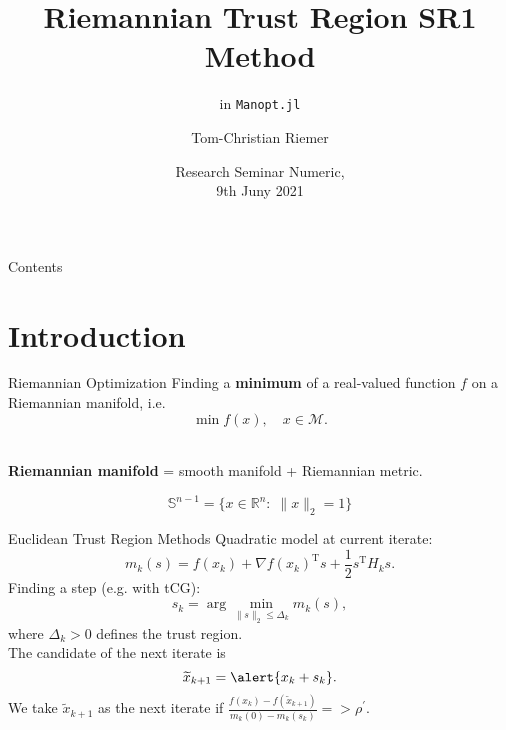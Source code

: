 \documentclass{beamer}
\title{Riemannian Trust Region SR1 Method}
\subtitle{in \lstinline!Manopt.jl!}
\author{Tom-Christian Riemer}
\institute{TU Chemnitz}
\date{Research Seminar Numeric,\\ 9th Juny 2021}
\begin{document}
\maketitle

\begin{frame}{Contents}
	\tableofcontents
\end{frame}

\section{Introduction}

\begin{frame}{Riemannian Optimization}
    Finding a \textbf{minimum} of a real-valued function $f$ on a Riemannian manifold, i.e.
    \begin{equation*}
        \min f(x), \quad x \in \mathcal{M}.
    \end{equation*}\\[1.\baselineskip]
    \begin{center}
        \textbf{Riemannian manifold} = smooth manifold + Riemannian metric. \\[1.\baselineskip]
    \end{center}
    \begin{equation*}
        \mathbb{S}^{n-1} = \{ x \in \mathbb{R}^n \colon \; \lVert x \rVert_2 = 1 \}
    \end{equation*}
\end{frame}

\begin{frame}{Euclidean Trust Region Methods}
    \alert{Quadratic model} at current iterate:
	\begin{equation*}
    	m_k(s) = f(x_k) + {\nabla f(x_k)}^{\mathrm{T}} s + \frac{1}{2} s^{\mathrm{T}} H_k s.
    \end{equation*}
	Finding a \alert{step} (e.g. with tCG):
	\begin{equation*}
        s_k = \arg \min_{\lVert s \rVert_2 \leq \Delta_k} m_k(s),
    \end{equation*}
	where $\Delta_k > 0$ defines the \alert{trust region}. \\
    The candidate of the next iterate is
	\begin{equation*}
        \widetilde{x}_{k+1} = \alert{x_k + s_k}.
    \end{equation*}
	We take $\widetilde{x}_{k+1}$ as the next iterate if $\frac{f(x_k) - f(\widetilde{x}_{k+1})}{m_k(0) - m_k(s_k)} = > \rho^{\prime}$.
\end{frame}
\end{document}
